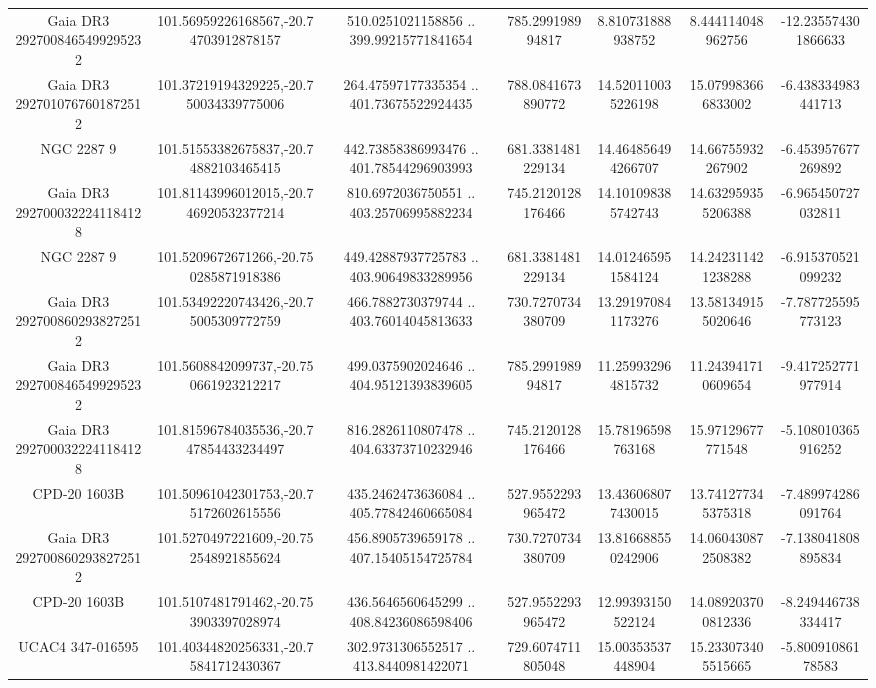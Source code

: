 \begin{table}
\begin{tabular}{ccccccc}
Gaia DR3 2927008465499295232 & 101.56959226168567,-20.74703912878157 & 510.0251021158856 .. 399.99215771841654 & 785.299198994817 & 8.810731888938752 & 8.444114048962756 & -12.235574301866633 \\
Gaia DR3 2927010767601872512 & 101.37219194329225,-20.750034339775006 & 264.47597177335354 .. 401.73675522924435 & 788.0841673890772 & 14.520110035226198 & 15.079983666833002 & -6.438334983441713 \\
NGC  2287     9 & 101.51553382675837,-20.74882103465415 & 442.73858386993476 .. 401.78544296903993 & 681.3381481229134 & 14.464856494266707 & 14.66755932267902 & -6.453957677269892 \\
Gaia DR3 2927000322241184128 & 101.81143996012015,-20.746920532377214 & 810.6972036750551 .. 403.25706995882234 & 745.2120128176466 & 14.101098385742743 & 14.632959355206388 & -6.965450727032811 \\
NGC  2287     9 & 101.5209672671266,-20.750285871918386 & 449.42887937725783 .. 403.90649833289956 & 681.3381481229134 & 14.012465951584124 & 14.242311421238288 & -6.915370521099232 \\
Gaia DR3 2927008602938272512 & 101.53492220743426,-20.75005309772759 & 466.7882730379744 .. 403.76014045813633 & 730.7270734380709 & 13.291970841173276 & 13.581349155020646 & -7.787725595773123 \\
Gaia DR3 2927008465499295232 & 101.5608842099737,-20.750661923212217 & 499.0375902024646 .. 404.95121393839605 & 785.299198994817 & 11.259932964815732 & 11.243941710609654 & -9.417252771977914 \\
Gaia DR3 2927000322241184128 & 101.81596784035536,-20.747854433234497 & 816.2826110807478 .. 404.63373710232946 & 745.2120128176466 & 15.78196598763168 & 15.97129677771548 & -5.108010365916252 \\
CPD-20  1603B & 101.50961042301753,-20.75172602615556 & 435.2462473636084 .. 405.77842460665084 & 527.9552293965472 & 13.436068077430015 & 13.741277345375318 & -7.489974286091764 \\
Gaia DR3 2927008602938272512 & 101.5270497221609,-20.752548921855624 & 456.8905739659178 .. 407.15405154725784 & 730.7270734380709 & 13.816688550242906 & 14.060430872508382 & -7.138041808895834 \\
CPD-20  1603B & 101.5107481791462,-20.753903397028974 & 436.5646560645299 .. 408.84236086598406 & 527.9552293965472 & 12.99393150522124 & 14.089203700812336 & -8.249446738334417 \\
UCAC4 347-016595 & 101.40344820256331,-20.75841712430367 & 302.9731306552517 .. 413.8440981422071 & 729.6074711805048 & 15.00353537448904 & 15.233073405515665 & -5.80091086178583 \\

\end{tabular}
\end{table}
